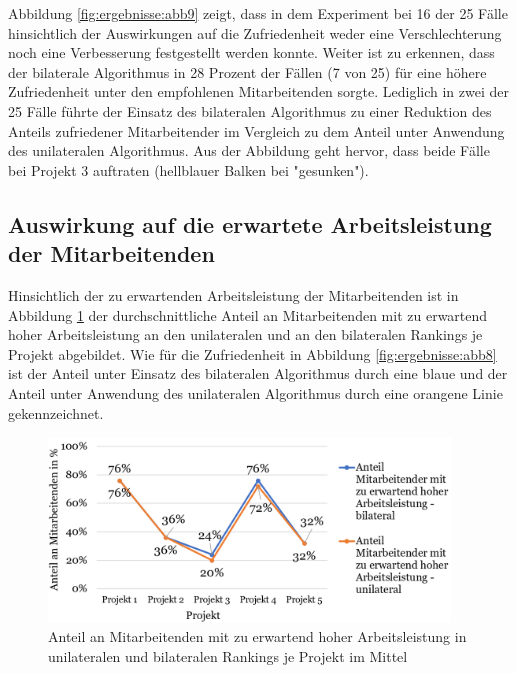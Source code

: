 Abbildung \ref{fig:ergebnisse:abb9} zeigt, dass in dem Experiment bei 16 der 25 Fälle hinsichtlich der Auswirkungen auf die Zufriedenheit weder eine Verschlechterung noch eine Verbesserung festgestellt werden konnte.
Weiter ist zu erkennen, dass der bilaterale Algorithmus in 28 Prozent der Fällen (7 von 25) für eine höhere Zufriedenheit unter den empfohlenen Mitarbeitenden sorgte.
Lediglich in zwei der 25 Fälle führte der Einsatz des bilateralen Algorithmus zu einer Reduktion des Anteils zufriedener Mitarbeitender im Vergleich zu dem Anteil unter Anwendung des unilateralen Algorithmus.
Aus der Abbildung geht hervor, dass beide Fälle bei Projekt 3 auftraten (hellblauer Balken bei "gesunken").


\subsection{Auswirkung auf die erwartete Arbeitsleistung der Mitarbeitenden}
Hinsichtlich der zu erwartenden Arbeitsleistung der Mitarbeitenden ist in Abbildung \ref{fig:ergebnisse:abb10} der durchschnittliche Anteil an Mitarbeitenden mit zu erwartend hoher Arbeitsleistung an den unilateralen und an den bilateralen Rankings je Projekt abgebildet.
Wie für die Zufriedenheit in Abbildung \ref{fig:ergebnisse:abb8} ist der Anteil unter Einsatz des bilateralen Algorithmus durch eine blaue und der Anteil unter Anwendung des unilateralen Algorithmus durch eine orangene Linie gekennzeichnet.

\begin{figure}[H]
    \centering
	\includegraphics[width=0.95\textwidth]{gfx/verhaeltnis-a-durchschnitt-projekte.png}
	\caption[Anteil an Mitarbeitenden mit zu erwartend hoher Arbeitsleistung in unilateralen und bilateralen Rankings je Projekt im Mittel]{Anteil an Mitarbeitenden mit zu erwartend hoher Arbeitsleistung in unilateralen und bilateralen Rankings je Projekt im Mittel}
	\label{fig:ergebnisse:abb10}
\end{figure}

